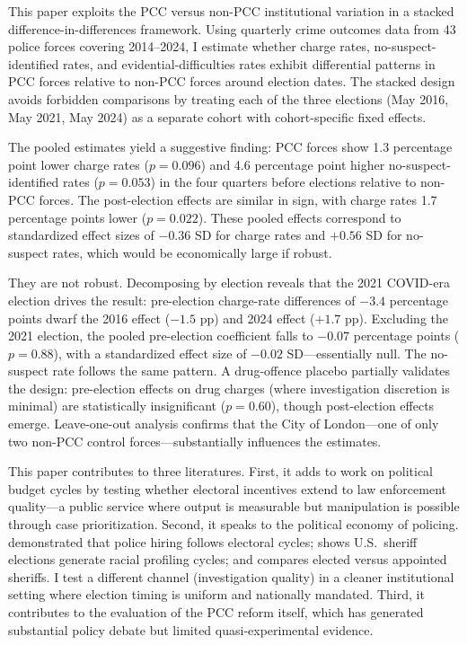 \documentclass[12pt]{article}
\begin{document}
This paper exploits the PCC versus non-PCC institutional variation in a stacked difference-in-differences framework. Using quarterly crime outcomes data from 43 police forces covering 2014--2024, I estimate whether charge rates, no-suspect-identified rates, and evidential-difficulties rates exhibit differential patterns in PCC forces relative to non-PCC forces around election dates. The stacked design avoids forbidden comparisons by treating each of the three elections (May 2016, May 2021, May 2024) as a separate cohort with cohort-specific fixed effects.

The pooled estimates yield a suggestive finding: PCC forces show 1.3 percentage point lower charge rates ($p = 0.096$) and 4.6 percentage point higher no-suspect-identified rates ($p = 0.053$) in the four quarters before elections relative to non-PCC forces. The post-election effects are similar in sign, with charge rates 1.7 percentage points lower ($p = 0.022$). These pooled effects correspond to standardized effect sizes of $-0.36$ SD for charge rates and $+0.56$ SD for no-suspect rates, which would be economically large if robust.

They are not robust. Decomposing by election reveals that the 2021 COVID-era election drives the result: pre-election charge-rate differences of $-3.4$ percentage points dwarf the 2016 effect ($-1.5$ pp) and 2024 effect ($+1.7$ pp). Excluding the 2021 election, the pooled pre-election coefficient falls to $-0.07$ percentage points ($p = 0.88$), with a standardized effect size of $-0.02$ SD---essentially null. The no-suspect rate follows the same pattern. A drug-offence placebo partially validates the design: pre-election effects on drug charges (where investigation discretion is minimal) are statistically insignificant ($p = 0.60$), though post-election effects emerge. Leave-one-out analysis confirms that the City of London---one of only two non-PCC control forces---substantially influences the estimates.

This paper contributes to three literatures. First, it adds to work on political budget cycles \citep{drazen2000political, shi2006political} by testing whether electoral incentives extend to law enforcement quality---a public service where output is measurable but manipulation is possible through case prioritization. Second, it speaks to the political economy of policing. \citet{levitt1997using} demonstrated that police hiring follows electoral cycles; \citet{masera2021policing} shows U.S.\ sheriff elections generate racial profiling cycles; and \citet{owens2020examining} compares elected versus appointed sheriffs. I test a different channel (investigation quality) in a cleaner institutional setting where election timing is uniform and nationally mandated. Third, it contributes to the evaluation of the PCC reform itself, which has generated substantial policy debate \citep{lister2014police, sampson2012policing} but limited quasi-experimental evidence.
\end{document}
